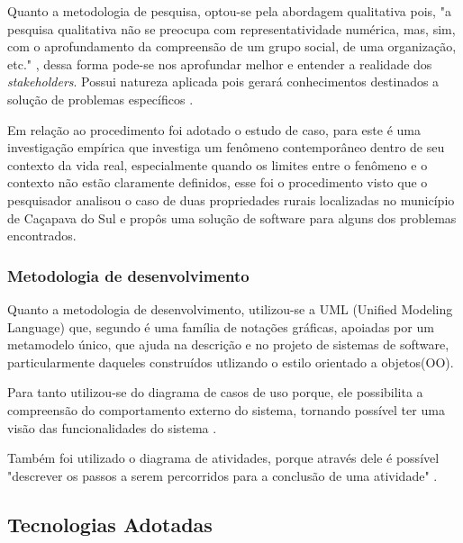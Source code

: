 \documentclass[12pt]{article}
\begin{document}
\begin{titlepage}
\begin{center}
Quanto a metodologia de pesquisa, optou-se pela abordagem qualitativa pois, "a pesquisa qualitativa não se preocupa com representatividade numérica, mas, sim, com o aprofundamento da compreensão de um grupo social, de uma organização, etc." \cite{ufrgs09}, dessa forma pode-se nos aprofundar melhor e entender a realidade dos \emph{stakeholders}. Possui natureza aplicada pois gerará conhecimentos destinados a solução de problemas específicos \cite{ufrgs09} .

Em relação ao procedimento foi adotado o estudo de caso, para  este é uma investigação empírica que investiga um fenômeno contemporâneo dentro de seu contexto da vida real, especialmente quando os limites entre o fenômeno e o contexto não estão claramente definidos, esse foi o procedimento visto que o pesquisador analisou o caso de duas propriedades rurais localizadas no município de Caçapava do Sul e propôs uma solução de software para alguns dos problemas encontrados.

\subsubsection{Metodologia de desenvolvimento}

Quanto a metodologia de desenvolvimento, utilizou-se a UML (Unified Modeling Language) que, segundo  é uma família de notações gráficas, apoiadas por um metamodelo único, que ajuda na descrição e no projeto de sistemas de software, particularmente daqueles construídos utlizando o estilo orientado a objetos(OO).

Para tanto utilizou-se do diagrama de casos de uso porque, ele possibilita a compreensão do comportamento externo do sistema, tornando possível ter uma visão das funcionalidades do sistema \cite{guedes18}.

Também foi utilizado o diagrama de atividades, porque através dele é possível "descrever os passos a serem percorridos para a conclusão de uma atividade" \cite{guedes18}.

\subsection{Tecnologias Adotadas}


\end{center}
\end{titlepage}
\end{document}
